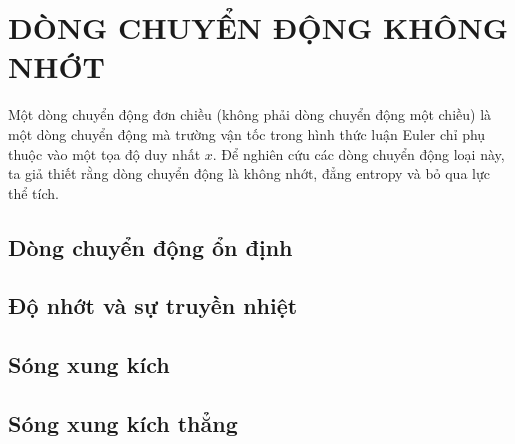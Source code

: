 \documentclass[../../main.tex]{subfiles}
\begin{document}
\chapter{DÒNG CHUYỂN ĐỘNG KHÔNG NHỚT}
\minitoc
	Một dòng chuyển động đơn chiều (không phải dòng chuyển động một chiều) là một dòng chuyển động mà trường vận tốc trong hình thức luận Euler chỉ phụ thuộc vào một tọa độ duy nhất $x$. Để nghiên cứu các dòng chuyển động loại này, ta giả thiết rằng dòng chuyển động là không nhớt, đẳng entropy và bỏ qua lực thể tích.
    \section{Dòng chuyển động ổn định}
		
    \section{Độ nhớt và sự truyền nhiệt}
    
    \section{Sóng xung kích}

    \section{Sóng xung kích thẳng}
\end{document}
